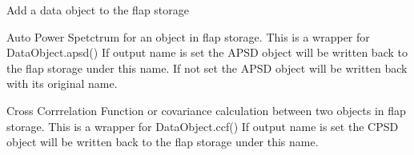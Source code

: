 \documentclass[letterpaper,10pt,english]{sphinxmanual}
\begin{document}
\begin{fulllineitems}
\label{\detokenize{data_object:flap.data_object.add_data_object}}
Add a data object to the flap storage

\end{fulllineitems}


\begin{fulllineitems}
\label{\detokenize{data_object:flap.data_object.apsd}}
Auto Power Spetctrum for an object in flap storage. This is a wrapper for DataObject.apsd()
If output name is set the APSD object will be written back to the flap storage under this name.
If not set the APSD object will be written back with its original name.

\end{fulllineitems}


\begin{fulllineitems}
\label{\detokenize{data_object:flap.data_object.ccf}}
Cross Corrrelation Function or covariance calculation between two objects in flap storage.
This is a wrapper for DataObject.ccf()
If output name is set the CPSD object will be written back to the flap storage under this name.

\end{fulllineitems}
\end{document}
